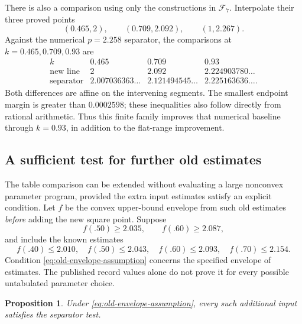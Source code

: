 \documentclass[11pt]{article}
\numberwithin{equation}{section}
\newtheorem{proposition}[theorem]{Proposition}
\theoremstyle{definition}
\theoremstyle{remark}
\begin{document}
There is also a comparison using only the constructions in
\(\mathcal F_7\).  Interpolate their three proved points
\[
 (0.465,2),\qquad(0.709,2.092),\qquad(1,2.267).
\]
Against the numerical \(p=2.258\) separator, the comparisons at
\(k=0.465,0.709,0.93\) are
\[
\begin{array}{c|ccc}
k&0.465&0.709&0.93\\ \hline
\text{new line}&2&2.092&2.224903780\ldots\\
\text{separator}&2.007036363\ldots&2.121494545\ldots&
 2.225163636\ldots .
\end{array}
\]
Both differences are affine on the intervening segments.
The smallest endpoint margin is greater than \(0.0002598\);
these inequalities also follow directly from rational arithmetic.
Thus this finite family improves that numerical baseline through
\(k=0.93\), in addition to the flat-range improvement.

\subsection{A sufficient test for further old estimates}

The table comparison can be extended without evaluating a large
nonconvex parameter program, provided the extra input estimates
satisfy an explicit condition.
Let \(f\) be the convex upper-bound envelope from such old estimates
\emph{before} adding the new square point.
Suppose
\begin{equation}\label{eq:old-envelope-assumption}
 f(.50)\ge2.035,\qquad f(.60)\ge2.087,
\end{equation}
and include the known estimates
\[
 f(.40)\le2.010,\quad f(.50)\le2.043,\quad
 f(.60)\le2.093,\quad f(.70)\le2.154.
\]
Condition \eqref{eq:old-envelope-assumption} concerns the specified
envelope of estimates.  The published record values alone do not
prove it for every possible untabulated parameter choice.

\begin{proposition}\label{prop:extra-inputs}
Under \eqref{eq:old-envelope-assumption}, every such additional input
satisfies the separator test.
\end{proposition}
\end{document}
